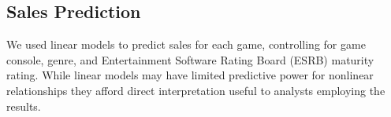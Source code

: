 \documentclass[letterpaper]{article}
\begin{document}








\subsection{Sales Prediction}
We used linear models to predict sales for each game, controlling for game console, genre, and Entertainment Software Rating Board (ESRB) maturity rating. While linear models may have limited predictive power for nonlinear relationships they afford direct interpretation useful to analysts employing the results. 
\end{document}
